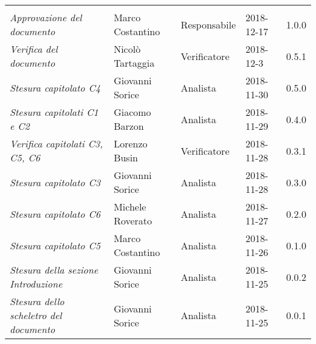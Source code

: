 \newpage 
\section*{}
\begin{table}[H]
	\centering
	\begin{tabular}{p{4cm}|C{3cm}|C{3cm}|R{2.5cm}|R{2cm}}
		
		 & & & & \\
		
		
		\emph{Approvazione del documento} & Marco Costantino & Responsabile & 2018-12-17 & 1.0.0 \\
		\hline
		
		\emph{Verifica del documento} & Nicolò Tartaggia & Verificatore & 2018-12-3 & 0.5.1 \\
		\hline
		
		\emph{Stesura capitolato C4 } & Giovanni Sorice & Analista & 2018-11-30 & 0.5.0 \\
		\hline
		
		\emph{Stesura capitolati C1 e C2} & Giacomo Barzon & Analista & 2018-11-29 & 0.4.0 \\
		\hline
		
		\emph{Verifica capitolati C3, C5, C6} & Lorenzo Busin & Verificatore & 2018-11-28 & 0.3.1 \\
		\hline
		
		\emph{Stesura capitolato C3 } & Giovanni Sorice & Analista & 2018-11-28 & 0.3.0 \\
		\hline
		
		\emph{Stesura capitolato C6 } & Michele Roverato & Analista & 2018-11-27 & 0.2.0 \\
		\hline
		
		\emph{Stesura capitolato C5 } & Marco Costantino & Analista & 2018-11-26 & 0.1.0 \\
		\hline
		
		\emph{Stesura della sezione Introduzione } & Giovanni Sorice & Analista & 2018-11-25 & 0.0.2 \\
		\hline
		
		\emph{Stesura dello scheletro del documento} & Giovanni Sorice & Analista & 2018-11-25 & 0.0.1 \\
		
	\end{tabular}
	
\end{table}


\clearpage